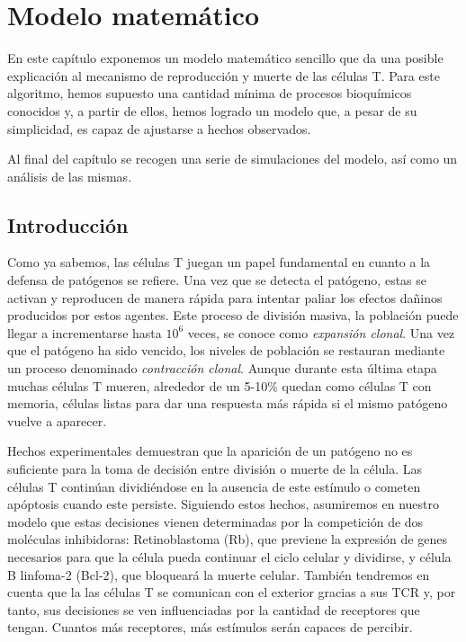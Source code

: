 \chapter{Modelo matemático}
\label{cap:descripcionTrabajo}

En este capítulo exponemos un modelo matemático sencillo que da una posible explicación al mecanismo de reproducción y muerte de las células T. Para este algoritmo, hemos supuesto una cantidad mínima de procesos bioquímicos conocidos y, a partir de ellos, hemos logrado un modelo que, a pesar de su simplicidad, es capaz de ajustarse a hechos observados. 

Al final del capítulo se recogen una serie de simulaciones del modelo, así como un análisis de las mismas. 

\section{Introducción}

Como ya sabemos, las células T juegan un papel fundamental en cuanto a la defensa de patógenos se refiere. Una vez que se detecta el patógeno, estas se activan y reproducen de manera rápida para intentar paliar los efectos dañinos producidos por estos agentes. Este proceso de división masiva, la población puede llegar a incrementarse hasta $10^6$ veces, se conoce como \textit{expansión clonal}. Una vez que el patógeno ha sido vencido, los niveles de población se restauran mediante un proceso denominado \textit{contracción clonal}. Aunque durante esta última etapa muchas células T mueren, alrededor de un 5-10\% quedan como células T con memoria, células listas para dar una respuesta más rápida si el mismo patógeno vuelve a aparecer. 

Hechos experimentales demuestran que la aparición de un patógeno no es suficiente para la toma de decisión entre división o muerte de la célula. Las células T continúan dividiéndose en la ausencia de este estímulo o cometen apóptosis cuando este persiste. 
Siguiendo estos hechos, asumiremos en nuestro modelo que estas decisiones vienen determinadas por la competición de dos moléculas inhibidoras: Retinoblastoma (Rb), que previene la expresión de genes necesarios para que la célula pueda continuar el ciclo celular y dividirse, y célula B linfoma-2 (Bcl-2), que bloqueará la muerte celular. También tendremos en cuenta que la las células T se comunican con el exterior gracias a sus TCR y, por tanto, sus decisiones se ven influenciadas por la cantidad de receptores que tengan. Cuantos más receptores, más estímulos serán capaces de percibir.


